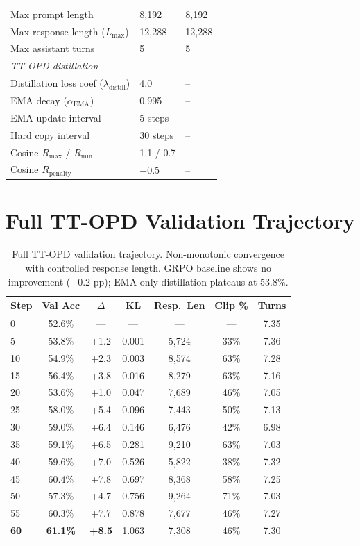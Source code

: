\documentclass{article}
\begin{document}
\begin{table}[h]
\begin{tabular}{lll}
Max prompt length & 8,192 & 8,192 \\
Max response length ($L_{\max}$) & 12,288 & 12,288 \\
Max assistant turns & 5 & 5 \\
\midrule
\multicolumn{3}{l}{\emph{TT-OPD distillation}} \\
Distillation loss coef ($\lambda_{\text{distill}}$) & 4.0 & -- \\
EMA decay ($\alpha_{\text{EMA}}$) & 0.995 & -- \\
EMA update interval & 5 steps & -- \\
Hard copy interval & 30 steps & -- \\
Cosine $R_{\text{max}}$ / $R_{\text{min}}$ & 1.1 / 0.7 & -- \\
Cosine $R_{\text{penalty}}$ & $-0.5$ & -- \\
\bottomrule
\end{tabular}
\end{table}


\section{Full TT-OPD Validation Trajectory}
\label{app:trajectory}

\begin{table}[h]
\centering
\caption{Full TT-OPD validation trajectory. Non-monotonic convergence with controlled response length. GRPO baseline shows no improvement ($\pm$0.2 pp); EMA-only distillation plateaus at 53.8\%.}
\label{tab:opd_trajectory}
\small
\begin{tabular}{lcccccc}
\toprule
\textbf{Step} & \textbf{Val Acc} & \textbf{$\Delta$} & \textbf{KL} & \textbf{Resp.\ Len} & \textbf{Clip \%} & \textbf{Turns} \\
\midrule
0 & 52.6\% & --- & --- & --- & --- & 7.35 \\
5 & 53.8\% & +1.2 & 0.001 & 5,724 & 33\% & 7.36 \\
10 & 54.9\% & +2.3 & 0.003 & 8,574 & 63\% & 7.28 \\
15 & 56.4\% & +3.8 & 0.016 & 8,279 & 63\% & 7.16 \\
20 & 53.6\% & +1.0 & 0.047 & 7,689 & 46\% & 7.05 \\
25 & 58.0\% & +5.4 & 0.096 & 7,443 & 50\% & 7.13 \\
30 & 59.0\% & +6.4 & 0.146 & 6,476 & 42\% & 6.98 \\
35 & 59.1\% & +6.5 & 0.281 & 9,210 & 63\% & 7.03 \\
40 & 59.6\% & +7.0 & 0.526 & 5,822 & 38\% & 7.32 \\
45 & 60.4\% & +7.8 & 0.697 & 8,368 & 58\% & 7.25 \\
50 & 57.3\% & +4.7 & 0.756 & 9,264 & 71\% & 7.03 \\
55 & 60.3\% & +7.7 & 0.878 & 7,677 & 46\% & 7.27 \\
\textbf{60} & \textbf{61.1\%} & \textbf{+8.5} & 1.063 & 7,308 & 46\% & 7.30 \\
\bottomrule
\end{tabular}
\end{table}
\end{document}
